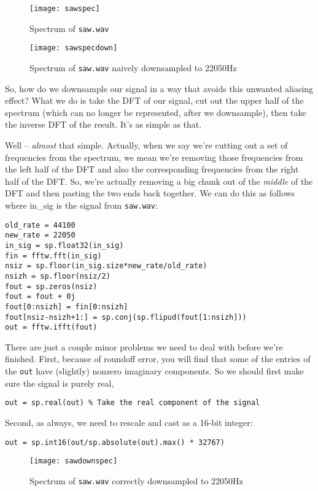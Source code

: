 \begin{figure}[ht]\caption{Spectrum of \texttt{saw.wav}}\label{sawspec}\centering\texttt{[image: sawspec]}\end{figure}

\begin{figure}[ht]\caption{Spectrum of \texttt{saw.wav} naively downsampled to 22050Hz}\label{sawspecdown}\centering\texttt{[image: sawspecdown]}\end{figure}

So, how do we downsample our signal in a way that avoids this unwanted aliasing effect? What we do is take the DFT of our signal, cut out the upper half of the spectrum (which can no longer be represented, after we downsample), then take the inverse DFT of the result. It's as simple as that.

Well -- \emph{almost} that simple. Actually, when we say we're cutting out a set of frequencies from the spectrum, we mean we're removing those frequencies from the left half of the DFT and also the corresponding frequencies from the right half of the DFT. So, we're actually removing a big chunk out of the \emph{middle} of the DFT and then pasting the two ends back together. We can do this as follows where in\_sig is the signal from \texttt{saw.wav}:
\begin{lstlisting}
old_rate = 44100
new_rate = 22050
in_sig = sp.float32(in_sig)
fin = fftw.fft(in_sig)
nsiz = sp.floor(in_sig.size*new_rate/old_rate)
nsizh = sp.floor(nsiz/2)
fout = sp.zeros(nsiz)
fout = fout + 0j
fout[0:nsizh] = fin[0:nsizh]
fout[nsiz-nsizh+1:] = sp.conj(sp.flipud(fout[1:nsizh]))
out = fftw.ifft(fout)
\end{lstlisting}
There are just a couple minor problems we need to deal with before we're finished. First, because of roundoff error, you will find that some of the entries of the \texttt{out} have (slightly) nonzero imaginary components.  So we should first make sure the signal is purely real,
\begin{lstlisting}
out = sp.real(out) % Take the real component of the signal
\end{lstlisting}
Second, as always, we need to rescale and cast as a 16-bit integer:
\begin{lstlisting}
out = sp.int16(out/sp.absolute(out).max() * 32767)
\end{lstlisting}


\begin{figure}[ht]\caption{Spectrum of \texttt{saw.wav} correctly downsampled to 22050Hz}\label{sawspecdown2}\centering\texttt{[image: sawdownspec]}\end{figure}

